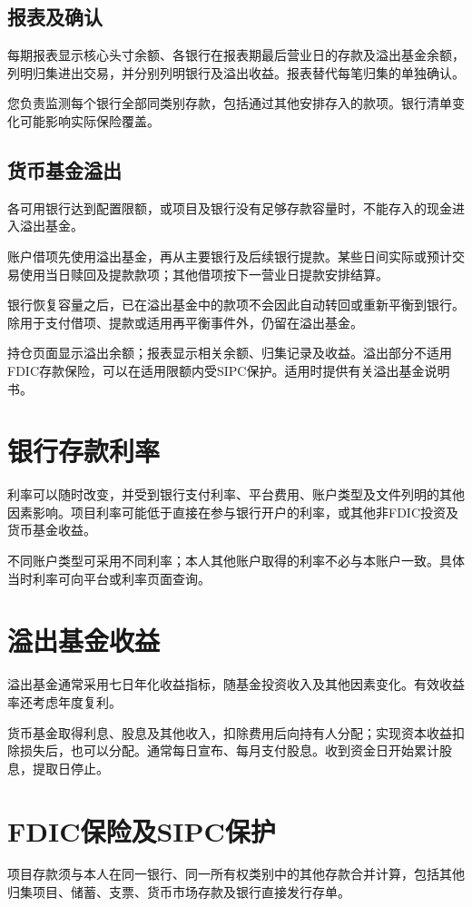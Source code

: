 \documentclass[UTF8,fontset=none,11pt,a4paper]{ctexart}
\begin{document}
\subsection*{报表及确认}
每期报表显示核心头寸余额、各银行在报表期最后营业日的存款及溢出基金余额，列明归集进出交易，并分别列明银行及溢出收益。报表替代每笔归集的\allowbreak\mbox{单独确认。}


您负责监测每个银行全部同类别存款，包括通过其他安排存入的款项。银行清单变化可能影响实际\allowbreak\mbox{保险覆盖。}


\subsection*{货币基金溢出}
各可用银行达到配置限额，或项目及银行没有足够存款容量时，不能存入的现金进入\allowbreak\mbox{溢出基金。}


账户借项先使用溢出基金，再从主要银行及后续银行提款。某些日间实际或预计交易使用当日赎回及提款款项；其他借项按下一营业日提款\allowbreak\mbox{安排结算。}


银行恢复容量之后，已在溢出基金中的款项不会因此自动转回或重新平衡到银行。除用于支付借项、提款或适用再平衡事件外，仍留在\allowbreak\mbox{溢出基金。}


持仓页面显示溢出余额；报表显示相关余额、归集记录及收益。溢出部分不适用FDIC存款保险，可以在适用限额内受SIPC保护。适用时提供有关溢出基\allowbreak\mbox{金说明书。}


\section*{银行存款利率}
利率可以随时改变，并受到银行支付利率、平台费用、账户类型及文件列明的其他因素影响。项目利率可能低于直接在参与银行开户的利率，或其他非FDIC投资及货币\allowbreak\mbox{基金收益。}


不同账户类型可采用不同利率；本人其他账户取得的利率不必与本账户一致。具体当时利率可向平台或利率\allowbreak\mbox{页面查询。}


\section*{溢出基金收益}
溢出基金通常采用七日年化收益指标，随基金投资收入及其他因素变化。有效收益率还考虑\allowbreak\mbox{年度复利。}


货币基金取得利息、股息及其他收入，扣除费用后向持有人分配；实现资本收益扣除损失后，也可以分配。通常每日宣布、每月支付股息。收到资金日开始累计股息，提\allowbreak\mbox{取日停止。}


\section*{FDIC保险及SIPC保护}
项目存款须与本人在同一银行、同一所有权类别中的其他存款合并计算，包括其他归集项目、储蓄、支票、货币市场存款及银行直接\allowbreak\mbox{发行存单。}
\end{document}

